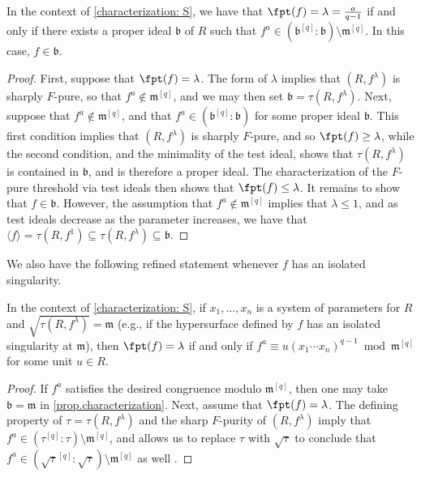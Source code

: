 \documentclass[11pt]{amsart}
\begin{document}
\begin{proposition}
\label{prop.characterization}
In the context of \autoref{characterization: S}, we have that $\fpt(f) = \lambda = {a \over q-1}$ if and only if there exists a proper ideal ${\mathfrak{b}}$ of $R$ 
such that $f^a  \in { \left({{{\mathfrak{b}}^{[q]}}}:{{\mathfrak{b}}} \right)} \setminus {\mathfrak{m}}^{[q]}$.
In this case, $f \in {\mathfrak{b}}$.
\end{proposition}
\begin{proof}
First, suppose that $\fpt(f) = \lambda$.  The form of  $\lambda$ implies that $(R, f^{\lambda})$ is sharply $F$-pure, so that $f^a \notin {\mathfrak{m}}^{[q]}$, and we may then set ${\mathfrak{b}} = \tau(R, f^{\lambda})$.  Next, suppose that $f^a \notin {\mathfrak{m}}^{[q]}$, and that $f^a \in { \left({{{\mathfrak{b}}^{[q]}}}:{{\mathfrak{b}}} \right)}$ for some proper ideal ${\mathfrak{b}}$.  This first condition implies that $(R, f^{\lambda})$ is sharply $F$-pure, and so $\fpt(f)\geq \lambda$, while the second condition, and the minimality of the test ideal, shows that $\tau(R, f^{\lambda})$ is contained in ${\mathfrak{b}}$, and is therefore a  proper ideal.  The characterization of the $F$-pure threshold via test ideals then  shows that $\fpt(f)\leq \lambda$.  It remains to show that $f \in {\mathfrak{b}}$.  However, the assumption that $f^a \notin {\mathfrak{m}}^{[q]}$ implies that $\lambda \leq 1$, and as test ideals decrease as the parameter increases, we have that
$\langle f \rangle  = \tau(R, f^{1}) \subseteq \tau(R, f^{\lambda}) \subseteq {\mathfrak{b}}$.
\end{proof}

We also have the following refined statement whenever $f$ has an isolated singularity.

\begin{lemma}
\label{lem.SpeciaFedderfptCriterion}  In the context of \autoref{characterization: S}, if $x_1, \ldots, x_n$ is a system of parameters for $R$ and $\sqrt{\tau(R, f^{\lambda})} = {\mathfrak{m}}$ (e.g., if the hypersurface defined by $f$ has an isolated singularity at ${\mathfrak{m}}$), then $\fpt(f) = \lambda$ if and only if $f^a \equiv u (x_1 \cdots x_n)^{q-1} \bmod {\mathfrak{m}}^{[q]}$ for some unit $u \in R$.
\end{lemma}
\begin{proof}
If $f^a$ satisfies the desired congruence modulo ${\mathfrak{m}}^{[q]}$, then one may take ${\mathfrak{b}} = {\mathfrak{m}}$ in \autoref{prop.characterization}.  Next, assume that $\fpt(f) = \lambda$.  The defining property of $\tau = \tau(R, f^{\lambda})$ and the sharp $F$-purity of $(R, f^{\lambda})$ imply that $f^a \in ( \tau^{[q]} : \tau) \setminus {\mathfrak{m}}^{[q]}$, and \cite[Proposition 4.10]{SchwedeCentersOfFPurity} allows us to replace $\tau$ with $\sqrt{\tau}$ to conclude that $f^a \in (\sqrt{\tau}^{[q]} : \sqrt{\tau}) \setminus {\mathfrak{m}}^{[q]}$ as well .
\end{proof}
\end{document}
